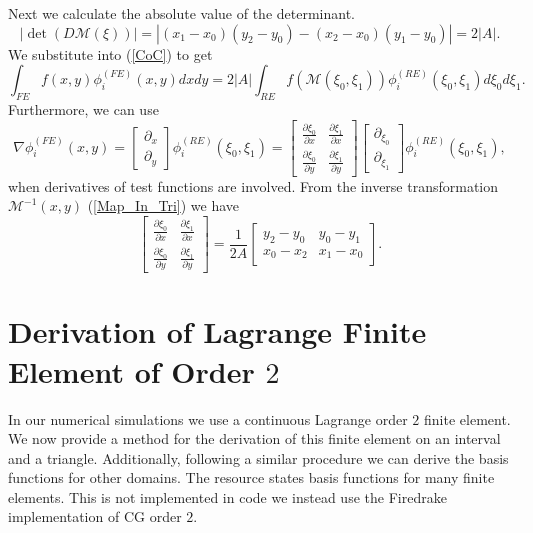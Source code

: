 \documentclass[12pt]{ociamthesis}
\begin{document}
Next we calculate the absolute value of the determinant. 
\begin{equation}
|\det(D\mathcal{M}(\xi))| = |(x_1-x_0)(y_2-y_0)-(x_2-x_0)(y_1-y_0)| = 2|A|.
\end{equation}
We substitute into (\ref{CoC}) to get
\begin{equation}
\int_{FE}f(x,y)\phi_i^{(FE)}(x,y)dxdy =
2|A|\int_{RE}f(\mathcal{M}(\xi_0,\xi_1)) \phi_i^{(RE)}(\xi_0,\xi_1)d\xi_0d\xi_1.
\end{equation}
Furthermore, we can use
\begin{equation}
\nabla \phi_i^{(FE)}(x,y) = 
\left [
\begin{matrix}
\partial_x \\
\partial_y
\end{matrix}
\right]
\phi_i^{(RE)}(\xi_0, \xi_1) =
\left[
\begin{matrix}
\frac{\partial \xi_0}{\partial x} & 
\frac{\partial \xi_1}{\partial x} \\
\frac{\partial \xi_0}{\partial y} &
\frac{\partial \xi_1}{\partial y}
\end{matrix}
\right] 
\left [
\begin{matrix}
\partial_{\xi_0} \\
\partial_{\xi_1}
\end{matrix}
\right ]
\phi_i^{(RE)}(\xi_0, \xi_1),
\end{equation}
when derivatives of test functions are involved. From the inverse transformation $\mathcal{M}^{-1}(x, y)$ (\ref{Map_In_Tri}) we have
\begin{equation}
\left[
\begin{matrix}
\frac{\partial \xi_0}{\partial x} & 
\frac{\partial \xi_1}{\partial x} \\
\frac{\partial \xi_0}{\partial y} &
\frac{\partial \xi_1}{\partial y}
\end{matrix}
\right] = \frac{1}{2A}
\left[
\begin{matrix}
y_2-y_0 & y_0-y_1 \\
x_0-x_2 & x_1-x_0 
\end{matrix}
\right].
\end{equation}

\section{Derivation of Lagrange Finite Element of Order $2$}
In our numerical simulations we use a continuous Lagrange order $2$ finite element. We now provide a method for the derivation of this finite element on an interval and a triangle. Additionally, following a similar procedure we can derive the basis functions for other domains. The resource \cite{defelement} states basis functions for many finite elements. This is not implemented in code we instead use the Firedrake implementation of CG order $2$. 
\end{document}
